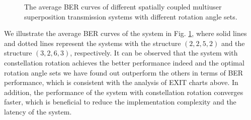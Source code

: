 \documentclass[conference]{IEEEtran}
\begin{document}
\begin{figure}[h!]
\setlength{\abovecaptionskip}{0.cm}
\setlength{\belowcaptionskip}{-0.cm}
  \caption{The average BER curves of different spatially coupled multiuser superposition transmission systems with different rotation angle sets.}\label{fig.8}
    \vspace{-1em}
\end{figure}
We illustrate the average BER curves of the system in Fig. \ref{fig.8}, where solid lines and dotted lines represent the systems with the structure $\left( {2,2,5,2} \right)$ and the structure $\left( {3,2,6,3} \right)$, respectively. It can be observed that the system with constellation rotation achieves the better performance indeed and the optimal rotation angle sets we have found out outperform the others in terms of BER performance, which is consistent with the analysis of EXIT charts above. In addition, the performance of the system with constellation rotation converges faster, which is beneficial to reduce the implementation complexity and the latency of the system.
\end{document}

